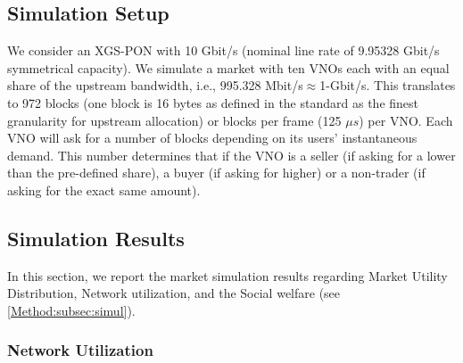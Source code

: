 \subsection{Simulation Setup}
We consider an XGS-PON \cite{G.9807.1} with 10 Gbit/s (nominal line rate of 9.95328 Gbit/s symmetrical capacity). We simulate a market with ten \acp{VNO} each with an equal share of the upstream bandwidth, i.e., 995.328 Mbit/s$\approx$1-Gbit/s. This translates to 972 blocks (one block is 16 bytes as defined in the standard \cite{G.9807.1} as the finest granularity for upstream allocation) or blocks per frame (125 $\mu s$) per VNO.
Each \ac{VNO} will ask for a number of blocks depending on its users' instantaneous demand. This number determines that if the \ac{VNO} is a seller (if asking for a lower than the pre-defined share), a buyer (if asking for higher) or a non-trader (if asking for the exact same amount).



\subsection{Simulation Results}
In this section, we report the market simulation results regarding Market Utility Distribution, Network utilization, and the Social welfare (see \autoref{Method:subsec:simul}). 


\subsubsection{Network Utilization}

